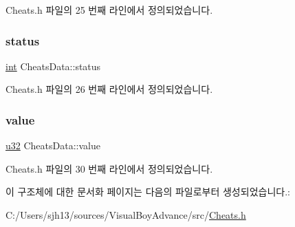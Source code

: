 Cheats.\+h 파일의 25 번째 라인에서 정의되었습니다.

\mbox{\label{struct_cheats_data_aeb36cfefe89db53cdb45909d35b9c6e4}} 
\subsubsection{\texorpdfstring{status}{status}}
{\footnotesize\ttfamily \mbox{\hyperlink{_util_8cpp_a0ef32aa8672df19503a49fab2d0c8071}{int}} Cheats\+Data\+::status}



Cheats.\+h 파일의 26 번째 라인에서 정의되었습니다.

\mbox{\label{struct_cheats_data_ab0df909850861e6314b1abb13c6305d1}} 
\subsubsection{\texorpdfstring{value}{value}}
{\footnotesize\ttfamily \mbox{\hyperlink{_system_8h_a10e94b422ef0c20dcdec20d31a1f5049}{u32}} Cheats\+Data\+::value}



Cheats.\+h 파일의 30 번째 라인에서 정의되었습니다.



이 구조체에 대한 문서화 페이지는 다음의 파일로부터 생성되었습니다.\+:\begin{DoxyCompactItemize}
\item 
C\+:/\+Users/sjh13/sources/\+Visual\+Boy\+Advance/src/\mbox{\hyperlink{_cheats_8h}{Cheats.\+h}}\end{DoxyCompactItemize}
